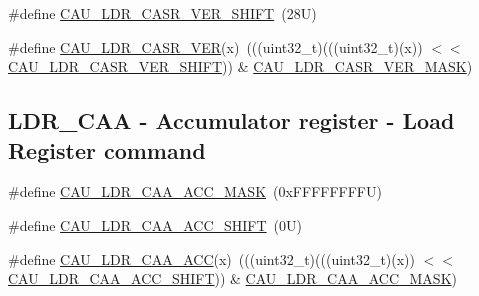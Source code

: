 \begin{DoxyCompactItemize}
\#define \mbox{\hyperlink{group___c_a_u___register___masks_ga6c0cd608dfa284be126e88595cfef13c}{C\+A\+U\+\_\+\+L\+D\+R\+\_\+\+C\+A\+S\+R\+\_\+\+V\+E\+R\+\_\+\+S\+H\+I\+FT}}~(28\+U)
\item 
\#define \mbox{\hyperlink{group___c_a_u___register___masks_gaba538fe03e857a34dab8ed29bcc127f8}{C\+A\+U\+\_\+\+L\+D\+R\+\_\+\+C\+A\+S\+R\+\_\+\+V\+ER}}(x)~(((uint32\+\_\+t)(((uint32\+\_\+t)(x)) $<$$<$ \mbox{\hyperlink{group___c_a_u___register___masks_ga6c0cd608dfa284be126e88595cfef13c}{C\+A\+U\+\_\+\+L\+D\+R\+\_\+\+C\+A\+S\+R\+\_\+\+V\+E\+R\+\_\+\+S\+H\+I\+FT}})) \& \mbox{\hyperlink{group___c_a_u___register___masks_gac3ea78b4eacaf7b3cf614dee61564e86}{C\+A\+U\+\_\+\+L\+D\+R\+\_\+\+C\+A\+S\+R\+\_\+\+V\+E\+R\+\_\+\+M\+A\+SK}})
\end{DoxyCompactItemize}
\subsection*{L\+D\+R\+\_\+\+C\+AA -\/ Accumulator register -\/ Load Register command}
\begin{DoxyCompactItemize}
\item 
\#define \mbox{\hyperlink{group___c_a_u___register___masks_ga25d23cb2902598fd7377214fc4c831c4}{C\+A\+U\+\_\+\+L\+D\+R\+\_\+\+C\+A\+A\+\_\+\+A\+C\+C\+\_\+\+M\+A\+SK}}~(0x\+F\+F\+F\+F\+F\+F\+F\+F\+U)
\item 
\#define \mbox{\hyperlink{group___c_a_u___register___masks_ga3d0a4b449aa40e73d9ef6540832fec08}{C\+A\+U\+\_\+\+L\+D\+R\+\_\+\+C\+A\+A\+\_\+\+A\+C\+C\+\_\+\+S\+H\+I\+FT}}~(0\+U)
\item 
\#define \mbox{\hyperlink{group___c_a_u___register___masks_ga4a805225201daa70b2aa5c3d47634361}{C\+A\+U\+\_\+\+L\+D\+R\+\_\+\+C\+A\+A\+\_\+\+A\+CC}}(x)~(((uint32\+\_\+t)(((uint32\+\_\+t)(x)) $<$$<$ \mbox{\hyperlink{group___c_a_u___register___masks_ga3d0a4b449aa40e73d9ef6540832fec08}{C\+A\+U\+\_\+\+L\+D\+R\+\_\+\+C\+A\+A\+\_\+\+A\+C\+C\+\_\+\+S\+H\+I\+FT}})) \& \mbox{\hyperlink{group___c_a_u___register___masks_ga25d23cb2902598fd7377214fc4c831c4}{C\+A\+U\+\_\+\+L\+D\+R\+\_\+\+C\+A\+A\+\_\+\+A\+C\+C\+\_\+\+M\+A\+SK}})
\end{DoxyCompactItemize}
